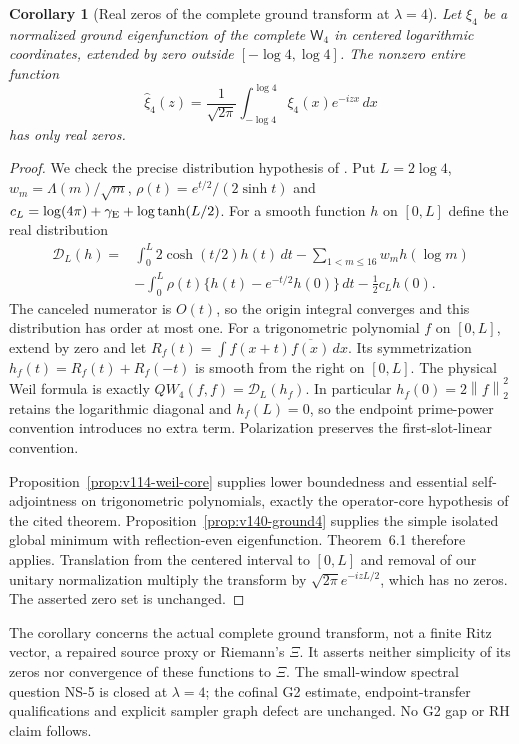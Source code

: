 \documentclass[11pt]{article}
\newtheorem{corollary}[theorem]{Corollary}
\theoremstyle{remark}
\newcommand{\norm}[1]{\left\lVert #1\right\rVert}
\begin{document}
\begin{corollary}[Real zeros of the complete ground transform at $\lambda=4$]
\label{cor:v140-real-zeros}
Let $\xi_4$ be a normalized ground eigenfunction of the complete
$\mathsf W_4$ in centered logarithmic coordinates, extended by zero
outside $[-\log4,\log4]$. The nonzero entire function
\[
 \widehat\xi_4(z)=\frac1{\sqrt{2\pi}}
       \int_{-\log4}^{\log4}\xi_4(x)e^{-izx}\,dx
\]
has only real zeros.
\end{corollary}
\begin{proof}
We check the precise distribution hypothesis of
\cite[Theorem~6.1 and Remark~4.3]{ConnesVanSuijlekom2025}.
Put $L=2\log4$, $w_m=\Lambda(m)/\sqrt m$,
$\rho(t)=e^{t/2}/(2\sinh t)$ and
$c_L=\log(4\pi)+\gamma_{\rm E}+\log\tanh(L/2)$.
For a smooth function $h$ on $[0,L]$ define the real distribution
\begin{align*}
 \mathcal D_L(h)={}&\int_0^L2\cosh(t/2)h(t)\,dt
       -\sum_{1<m\le16}w_m h(\log m)\\
 &-\int_0^L\rho(t)\{h(t)-e^{-t/2}h(0)\}\,dt
       -\tfrac12c_Lh(0).
\end{align*}
The canceled numerator is $O(t)$, so the origin integral converges
and this distribution has order at most one. For a trigonometric
polynomial $f$ on $[0,L]$, extend by zero and let
$R_f(t)=\int f(x+t)\overline{f(x)}\,dx$. Its symmetrization
$h_f(t)=R_f(t)+R_f(-t)$ is smooth from the right on $[0,L]$.
The physical Weil formula is exactly
$QW_4(f,f)=\mathcal D_L(h_f)$. In particular
$h_f(0)=2\norm f_2^2$ retains the logarithmic diagonal and
$h_f(L)=0$, so the endpoint prime-power convention introduces no
extra term. Polarization preserves the first-slot-linear convention.

Proposition~\ref{prop:v114-weil-core} supplies lower boundedness
and essential self-adjointness on trigonometric polynomials, exactly
the operator-core hypothesis of the cited theorem.
Proposition~\ref{prop:v140-ground4} supplies the simple isolated
global minimum with reflection-even eigenfunction. Theorem~6.1
therefore applies. Translation from the centered interval to $[0,L]$
and removal of our unitary normalization multiply the transform by
$\sqrt{2\pi}e^{-izL/2}$, which has no zeros. The asserted zero set
is unchanged.
\end{proof}

The corollary concerns the actual complete ground transform, not a
finite Ritz vector, a repaired source proxy or Riemann's $\Xi$.
It asserts neither simplicity of its zeros nor convergence of these
functions to $\Xi$. The small-window spectral question NS-5 is
closed at $\lambda=4$; the cofinal G2 estimate, endpoint-transfer
qualifications and explicit sampler graph defect are unchanged.
No G2 gap or RH claim follows.
\end{document}
